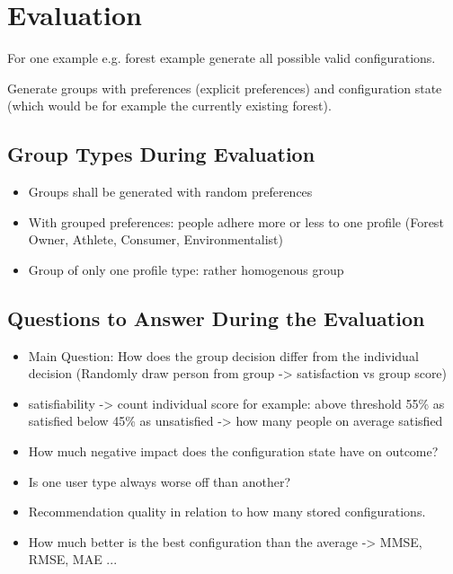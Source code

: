 \chapter{Evaluation}
\label{ch:Evaluation}

For one example e.g. forest example generate all possible valid configurations.

Generate groups with preferences (explicit preferences) and configuration state (which would be for example the currently existing forest).

\section{Group Types During Evaluation}
\label{sec:Evaluation:GroupTypes}

\begin{itemize}
    \item Groups shall be generated with random preferences
    \item With grouped preferences: people adhere more or less to one profile (Forest Owner, Athlete, Consumer, Environmentalist)
    \item Group of only one profile type: rather homogenous group
\end{itemize}

\section{Questions to Answer During the Evaluation}
\label{sec:Evaluation:Questions}


\begin{itemize}
    \item Main Question: How does the group decision differ from the individual decision (Randomly draw person from group -> satisfaction vs group score)
    \item satisfiability -> count individual score for example: above threshold 55\% as satisfied below 45\% as unsatisfied -> how many people on average satisfied
    \item How much negative impact does the configuration state have on outcome?
    \item Is one user type always worse off than another?
    \item Recommendation quality in relation to how many stored configurations.
    \item How much better is the best configuration than the average -> MMSE, RMSE, MAE ... %
\end{itemize}

